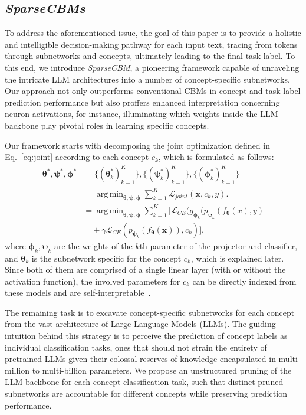 \documentclass[letterpaper]{article} %
\DeclareMathOperator*{\argmin}{arg\,min}
\begin{document}
\subsection{\textit{SparseCBMs}}
To address the aforementioned issue, the goal of this paper is to provide a holistic and intelligible decision-making pathway for each input text, tracing from tokens through subnetworks and concepts, ultimately leading to the final task label. 
To this end, we introduce \textit{SparseCBM}, a pioneering framework capable of unraveling the intricate LLM architectures into a number of concept-specific subnetworks. Our approach not only outperforms conventional CBMs in concept and task label prediction performance but also proffers enhanced interpretation concerning neuron activations, for instance, illuminating which weights inside the LLM backbone play pivotal roles in learning specific concepts.

Our framework starts with decomposing the joint optimization defined in Eq.~\eqref{eq:joint} according to each concept $c_k$, which is formulated as follows:
\begin{equation}\label{eq:decompose}
\begin{aligned}
    \bm{\theta}^{\ast}, \bm{\psi}^{\ast}, \bm{\phi}^{\ast} &= \{(\bm\theta^{\ast}_k)_{k=1}^{K}\}, \{(\bm\psi^{\ast}_k)_{k=1}^{K}\}, \{(\bm\phi^{\ast}_k)_{k=1}^{K}\} \\ &= \argmin_{\bm\theta, \bm\psi, \bm\phi} \sum_{k=1}^K \mathcal{L}_{joint}(\bm{x}, c_k, y). \\
    &= \argmin_{\bm\theta, \bm\psi, \bm\phi} \sum_{k=1}^K [\mathcal{L}_{CE} (g_{\bm{\phi}_k}(p_{\bm{\psi}_k}(f_{\bm{\theta}}(x),y) \\ &\quad+ \gamma \mathcal{L}_{CE} (p_{\bm{\psi}_k}(f_{\bm{\theta}}(\bm{x})),c_k)],
\end{aligned}
\end{equation}
where $\bm{\phi}_k, \bm{\psi}_k$ are the weights of the $k$th parameter of the projector and classifier, and $\bm{\theta}_k$ is the subnetwork specific for the concept $c_k$, which is explained later. Since both of them are comprised of a single linear layer (with or without the activation function), the involved parameters for $c_k$ can be directly indexed from these models and are self-interpretable~\cite{koh2020concept,tan2023cbm}. 

The remaining task is to excavate concept-specific subnetworks for each concept from the vast architecture of Large Language Models (LLMs). The guiding intuition behind this strategy is to perceive the prediction of concept labels as individual classification tasks, ones that should not strain the entirety of pretrained LLMs given their colossal reserves of knowledge encapsulated in multi-million to multi-billion parameters. We propose an unstructured pruning of the LLM backbone for each concept classification task, such that distinct pruned subnetworks are accountable for different concepts while preserving prediction performance.
\end{document}
